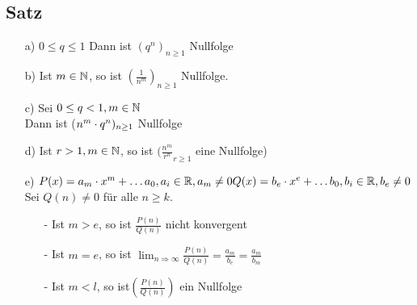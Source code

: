 \subsection[Satz: Kriterien für Nullfolgen]{Satz}\label{sec:2.9}
\begin{enumerate}
\item[a)] $0 \leq q \leq 1$ Dann ist $(q^n)_{n \geq 1}$ Nullfolge
\item[b)]Ist $m \in \mathbb{N}$, so ist $(\frac{1}{n^m})_{n \geq 1}$ Nullfolge.
\item[c)]Sei $0 \leq q < 1, m \in \mathbb{N}$\\
Dann ist ($n^m \cdot q^n)_{n \geq 1}$ Nullfolge
\item[d)] Ist $r > 1, m \in \mathbb{N}$, so ist $(\frac{n^m}{r^n}_{r \geq 1}$ eine Nullfolge)
\item[e)] $P(x) = a_m \cdot x^m + \ldots a_0, a_i \in \mathbb{R}, a_m \not = 0\\
Q(x) = b_e \cdot x^e + \ldots b_0 , b_i \in \mathbb{R} , b_e \not = 0$\\
Sei $Q(n) \not = 0 $ f\"ur alle $n \geq k.$\\
\begin{enumerate}
\item[-]Ist $m>e$, so ist $\frac{P(n)}{Q(n)}$ nicht konvergent
\item[-]Ist $m = e$, so ist $\lim_{n\Rightarrow \infty} \frac{P(n)}{Q(n)}= \frac{a_m}{b_e} = \frac{a_m}{b_m}$
\item[-]Ist $m < l$, so ist$ (\frac{P(n)}{Q(n)})$ ein Nullfolge
\end{enumerate}
\end{enumerate}
